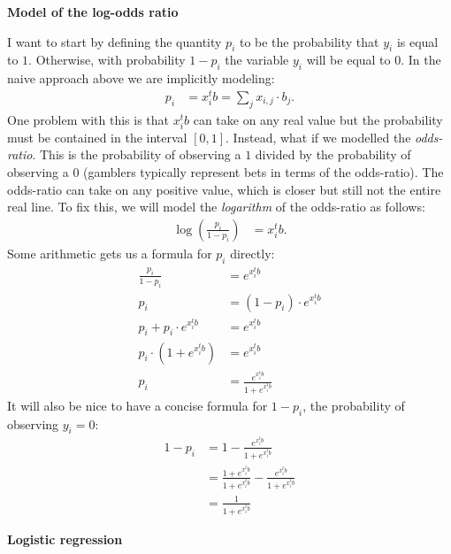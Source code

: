 \documentclass[12pt,hidelinks]{article}
\numberwithin{equation}{section}
\begin{document}
\textbf{Model of the log-odds ratio}

I want to start by defining the quantity $p_i$ to be the probability
that $y_i$ is equal to $1$. Otherwise, with probability $1-p_i$ the
variable $y_i$ will be equal to $0$. In the naive approach above
we are implicitly modeling:
\begin{align}
p_i &= x_i^t b = \sum_j x_{i, j} \cdot b_j.
\end{align}
One problem with this is that $x_i^t b$ can take on any real value
but the probability must be contained in the interval $[0,1]$. Instead,
what if we modelled the \textit{odds-ratio}. This is the probability of
observing a $1$ divided by the probability of observing a $0$ (gamblers
typically represent bets in terms of the odds-ratio). The odds-ratio can
take on any positive value, which is closer but still not the entire
real line. To fix this, we will model the \textit{logarithm} of the odds-ratio
as follows:
\begin{align}
\log\left(\frac{p_i}{1 - p_i}\right) &= x_i^t b.
\end{align}
Some arithmetic gets us a formula for $p_i$ directly:
\begin{align}
\frac{p_i}{1 - p_i} &= e^{x_i^t b} \\
p_i &= (1 - p_i) \cdot e^{x_i^t b} \\
p_i + p_i \cdot e^{x_i^t b} &= e^{x_i^t b} \\
p_i \cdot\left( 1 + e^{x_i^t b}\right) &= e^{x_i^t b} \\
p_i &= \frac{e^{x_i^t b}}{1 + e^{x_i^t b}}
\end{align}
It will also be nice to have a concise formula for $1-p_i$, the probability of
observing $y_i=0$:
\begin{align}
1 - p_i &= 1 - \frac{e^{x_i^t b}}{1 + e^{x_i^t b}} \\
&= \frac{1 + e^{x_i^t b}}{1 + e^{x_i^t b}} - \frac{e^{x_i^t b}}{1 + e^{x_i^t b}} \\
&= \frac{1}{1 + e^{x_i^t b}}
\end{align}

\textbf{Logistic regression}
\end{document}

